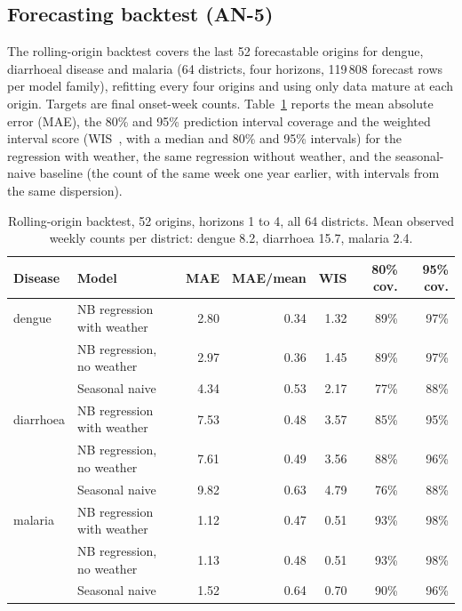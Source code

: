 \documentclass[conference]{IEEEtran}
\begin{document}
\subsection{Forecasting backtest (AN-5)}
The rolling-origin backtest covers the last 52 forecastable origins for dengue, diarrhoeal disease and malaria (64 districts, four horizons, 119\,808 forecast rows per model family), refitting every four origins and using only data mature at each origin. Targets are final onset-week counts. Table~\ref{tab:fc} reports the mean absolute error (MAE), the 80\% and 95\% prediction interval coverage and the weighted interval score (WIS~\cite{bracher}, with a median and 80\% and 95\% intervals) for the regression with weather, the same regression without weather, and the seasonal-naive baseline (the count of the same week one year earlier, with intervals from the same dispersion).
\begin{table}[t]\caption{Rolling-origin backtest, 52 origins, horizons 1 to 4, all 64 districts. Mean observed weekly counts per district: dengue 8.2, diarrhoea 15.7, malaria 2.4.}\label{tab:fc}\centering\small
\begin{tabular}{@{}llrrrrr@{}}\toprule Disease & Model & MAE & MAE/mean & WIS & 80\% cov. & 95\% cov. \\\midrule
dengue & NB regression with weather & 2.80 & 0.34 & 1.32 & 89\% & 97\% \\
 & NB regression, no weather & 2.97 & 0.36 & 1.45 & 89\% & 97\% \\
 & Seasonal naive & 4.34 & 0.53 & 2.17 & 77\% & 88\% \\
\midrule
diarrhoea & NB regression with weather & 7.53 & 0.48 & 3.57 & 85\% & 95\% \\
 & NB regression, no weather & 7.61 & 0.49 & 3.56 & 88\% & 96\% \\
 & Seasonal naive & 9.82 & 0.63 & 4.79 & 76\% & 88\% \\
\midrule
malaria & NB regression with weather & 1.12 & 0.47 & 0.51 & 93\% & 98\% \\
 & NB regression, no weather & 1.13 & 0.48 & 0.51 & 93\% & 98\% \\
 & Seasonal naive & 1.52 & 0.64 & 0.70 & 90\% & 96\% \\
\bottomrule\end{tabular}\end{table}
\end{document}
